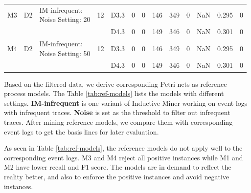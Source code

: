 \begin{table}[htp]
{\begin{tabular}{|llll|lllllllll|}
		M3                                                                      & D2                                                                        & \makecell[l]{IM-infrequent: \\ Noise Setting: 20} & 12                                                                         &D3.3 &  0  & 0   & 146   & 349   & 0       &NaN           &    0.295      & 0   \\
		
		&                                                                      & &                                                                          & D4.3 &  0  & 0   & 149   & 346   & 0       & NaN           &  0.301        &0    \\
		\hline 
		
		M4                                                                      & D2                                                                        & \makecell[l]{IM-infrequent: \\ Noise Setting: 50} & 12                                                                         &D3.3 &  0  &  0  &  146  & 349   & 0       & NaN           &     0.295     & 0\\   
		&                                                                      & &                                                                          & D4.3 &  0  & 0   & 149   & 346   & 0       & NaN           &  0.301        &0    \\
		
		\hline
	\end{tabular}
 }
\end{table}
Based on the filtered data, we derive corresponding Petri nets as reference process models. The Table \ref{tab:ref-models} lists the models with different settings. \textbf{IM-infrequent} is one variant of Inductive Miner working on event logs with infrequent traces. \textbf{Noise} is set as the threshold to filter out infrequent traces. After mining reference models, we compare them with  corresponding event logs to get the basis lines for later evaluation.

As seen in Table \ref{tab:ref-models}, the reference models do not apply well to the corresponding event logs. M3 and M4 reject all positive instances while M1 and M2 have lower recall and F1 score.  The models are in demand to reflect the reality better, and also to enforce the positive instances and avoid negative instances. 
